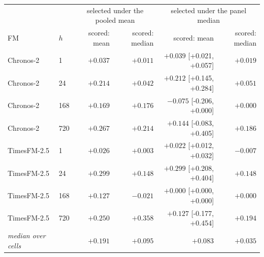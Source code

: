\begin{tabular}{llrrrr}
\toprule
 & & \multicolumn{2}{c}{selected under the pooled mean} & \multicolumn{2}{c}{selected under the panel median} \\
FM & $h$ & scored: mean & scored: median & scored: mean & scored: median \\
\midrule
Chronos-2 & 1 & $+0.037$ & $+0.011$ & $+0.039$ [+0.021, +0.057] & $+0.019$ \\
Chronos-2 & 24 & $+0.214$ & $+0.042$ & $+0.212$ [+0.145, +0.284] & $+0.051$ \\
Chronos-2 & 168 & $+0.169$ & $+0.176$ & $-0.075$ [-0.206, +0.000] & $+0.000$ \\
Chronos-2 & 720 & $+0.267$ & $+0.214$ & $+0.144$ [-0.083, +0.405] & $+0.186$ \\
TimesFM-2.5 & 1 & $+0.026$ & $+0.003$ & $+0.022$ [+0.012, +0.032] & $-0.007$ \\
TimesFM-2.5 & 24 & $+0.299$ & $+0.148$ & $+0.299$ [+0.208, +0.404] & $+0.148$ \\
TimesFM-2.5 & 168 & $+0.127$ & $-0.021$ & $+0.000$ [+0.000, +0.000] & $+0.000$ \\
TimesFM-2.5 & 720 & $+0.250$ & $+0.358$ & $+0.127$ [-0.177, +0.454] & $+0.194$ \\
\midrule
\emph{median over cells} & & $+0.191$ & $+0.095$ & $+0.083$ & $+0.035$ \\
\bottomrule
\end{tabular}
